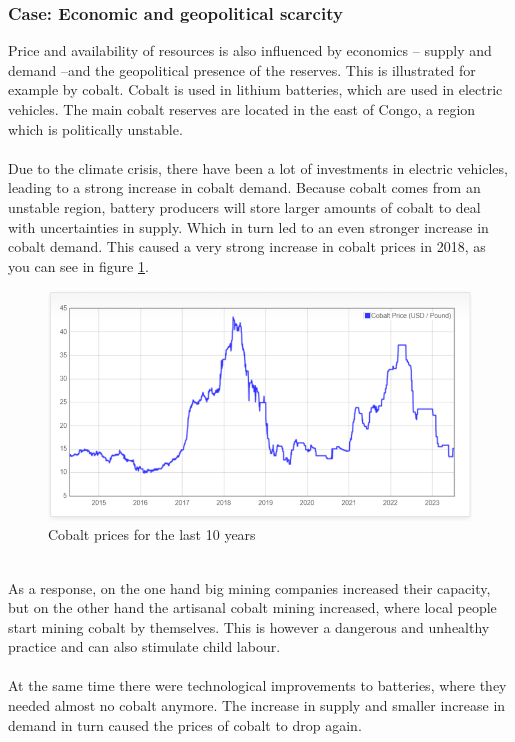 \documentclass[../summary.tex]{subfiles}
\begin{document}
\subsubsection{Case: Economic and geopolitical scarcity}

Price and availability of resources is also influenced by economics – supply and demand –and the geopolitical presence of the reserves. This is illustrated for example by cobalt. Cobalt is used in lithium batteries, which are used in electric vehicles. The main cobalt reserves are located in the east of Congo, a region which is politically unstable. \\
\\
Due to the climate crisis, there have been a lot of investments in electric vehicles, leading to a strong increase in cobalt demand. Because cobalt comes from an unstable region, battery producers will store larger amounts of cobalt to deal with uncertainties in supply. Which in turn led to an even stronger increase in cobalt demand. This caused a very strong increase in cobalt prices in 2018, as you can see in figure \ref{fig:cobaltprices}.

\begin{figure}[H]
	\centering
	\includegraphics[width=0.7\linewidth]{../images/cobalt_prices}
	\caption{Cobalt prices for the last 10 years}
	\label{fig:cobaltprices}
\end{figure}

\ \\
As a response, on the one hand big mining companies increased their capacity, but on the other hand the artisanal cobalt mining increased, where local people start mining cobalt by themselves. This is however a dangerous and unhealthy practice and can also stimulate child labour. \\
\\
At the same time there were technological improvements to batteries, where they needed almost no cobalt anymore. The increase in supply and smaller increase in demand in turn caused the prices of cobalt to drop again. 
\newpage
\end{document}

